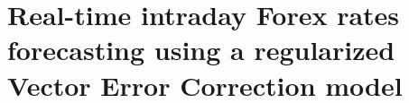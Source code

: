 \chapter{Real-time intraday Forex rates forecasting using a regularized Vector Error Correction model}



